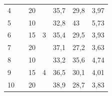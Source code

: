 \begin{table}[H]
\begin{tabular}{|l|l|l|l|l|l|l|}
4  &                                                                                                                       & 20 &                    & 35,7 & 29,8 & 3,97 \\ \cline{1-1} \cline{3-7} 
5  &                                                                                                                       & 10 & \multirow{3}{*}{3} & 32,8 & 43   & 5,73 \\ \cline{1-1} \cline{3-3} \cline{5-7} 
6  &                                                                                                                       & 15 &                    & 35,4 & 29,5 & 3,93 \\ \cline{1-1} \cline{3-3} \cline{5-7} 
7  &                                                                                                                       & 20 &                    & 37,1 & 27,2 & 3,63 \\ \cline{1-1} \cline{3-7} 
8  &                                                                                                                       & 10 & \multirow{3}{*}{4} & 33,2 & 35,6 & 4,74 \\ \cline{1-1} \cline{3-3} \cline{5-7} 
9  &                                                                                                                       & 15 &                    & 36,5 & 30,1 & 4,01 \\ \cline{1-1} \cline{3-3} \cline{5-7} 
10 &                                                                                                                       & 20 &                    & 38,9 & 28,7 & 3,83 \\ \hline
\end{tabular}
\end{table}

